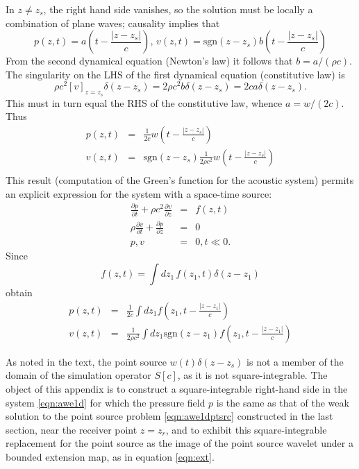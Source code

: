 In $z \ne z_s$, the right hand side 
vanishes, so the solution must be locally a combination of plane
waves; causality implies that
\[
p(z,t)=a\left(t -\frac{|z-z_s|}{c}\right), \, v(z,t)=\mbox{sgn}(z-z_s) b\left(t -
  \frac{|z-z_s|}{c}\right)
\]
From the second dynamical equation (Newton's law) it follows that $b =
a/(\rho c)$. The singularity on the LHS of the first dynamical
equation (constitutive law) is
\[
\rho c^2 [v]_{z=z_s}\delta(z-z_s) =
2\rho c^2 b\delta(z-z_s) = 2c a\delta(z-z_s).
\] 
This must in turn equal the RHS of the constitutive law, whence
$a=w/(2c)$. Thus
\begin{eqnarray}
\label{eqn:sol1dptsrc}
p(z,t) &=& \frac{1}{2c}w\left(t - \frac{|z-z_s|}{c}\right) \nonumber \\
v(z,t) &=& \mbox{sgn}(z-z_s)\frac{1}{2\rho c^2}w\left(t -\frac{|z-z_s|}{c}\right)
           \nonumber \\
\end{eqnarray}
This result (computation of the Green's function for the acoustic
system) permits an explicit expression for the system with a
space-time source:
\begin{eqnarray}
\label{eqn:awe1d}
\frac{\partial p}{\partial t} +\rho c^2\frac{\partial 
  v}{\partial z} &=& f(z,t) \nonumber\\
\rho \frac{\partial v}{\partial t} + \frac{\partial p}{\partial 
  z}&=&0\nonumber\\
 p,v&=&0, t \ll 0. 
\end{eqnarray}
Since
\[
  f(z,t) = \int dz_1\,f(z_1,t)\delta(z-z_1)
\]
obtain
\begin{eqnarray}
\label{eqn:sol1dp}
p(z,t) &=& \frac{1}{2c}\int dz_1 f\left(z_1,t -
           \frac{|z-z_1|}{c}\right) \\
  \label{eqn:sol1dv}
v(z,t) &=& \frac{1}{2\rho c^2} \int dz_1 \mbox{sgn} (z-z_1) f\left(z_1,t - \frac{|z-z_1|}{c}\right)
\end{eqnarray}


As noted in the text, the point source $w(t)\delta(z-z_s)$ is not a
member of the domain of the simulation operator $S[c]$, as it is not
square-integrable. The object of this appendix is to construct a square-integrable right-hand side in the
system \ref{eqn:awe1d} for which the pressure field $p$
is the same as that of the weak solution to the point source problem \ref{eqn:awe1dptsrc}
constructed in the last section, near the receiver point $z=z_r$, and
to exhibit this square-integrable replacement for the point source as
the image of the point source wavelet under a bounded extension map,
as in equation \ref{eqn:ext}.

